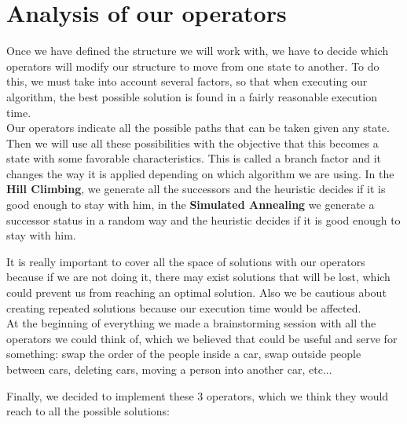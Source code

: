 \documentclass[12]{article}
\begin{document}
\section{Analysis of our operators}

Once we have defined the structure we will work with, we have to decide which operators will modify our structure to move from one  state to another. To do this, we must take into account several factors, so that when executing our algorithm, the best possible solution is found in a fairly reasonable execution time. 
\\
Our operators indicate all the possible paths that can be taken given any state. Then we will use all these possibilities with the objective that this becomes a state with some favorable characteristics. This is called a branch factor and it changes the way it is applied depending on which algorithm we are using. In the \textbf{Hill Climbing}, we generate all the successors and the heuristic decides if it is good enough to stay with him, in the \textbf{Simulated Annealing} we generate a successor status in a random way and the heuristic decides if it is good enough to stay with him. 
\\
\medskip

It is really important to cover all the space of solutions with our operators because if we are not doing it, there may exist solutions that will be lost, which could prevent us from reaching an optimal solution. Also we be cautious about creating repeated solutions because our execution time would be affected. 
\\

At the beginning of everything we made a brainstorming session with all the operators we could think of, which we believed that could be useful and serve for something: swap the order of the people inside a car, swap outside people between cars, deleting cars, moving a person into another car, etc...

Finally, we decided to implement these 3 operators, which we think they would reach to all the possible solutions:
\end{document}
